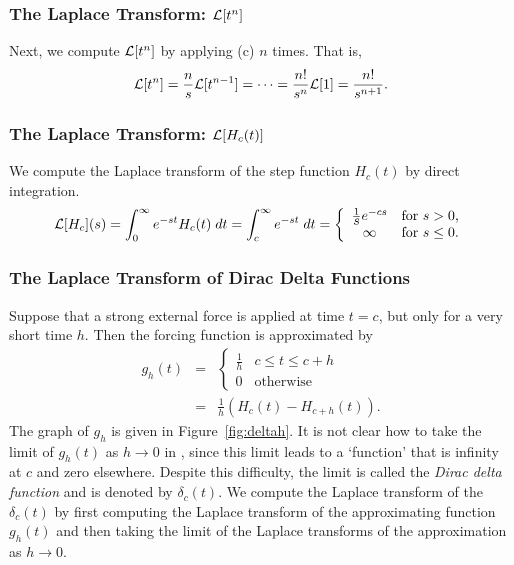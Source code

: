 \documentclass{ximera}
\begin{document}
\subsubsection*{The Laplace Transform: ${\cal L}[t^n]$}

Next, we compute ${\cal L}[t^n]$ by applying (c) $n$ times.
That is, 
\[
{\cal L}[t^n] = \frac{n}{s}{\cal L}[t^{n-1}] = \cdots =
\frac{n!}{s^n}{\cal L}[1] = \frac{n!}{s^{n+1}}.
\]

\subsubsection*{The Laplace Transform: ${\cal L}[H_c(t)]$}

We compute the Laplace transform of the step function $H_c(t)$ by direct 
integration.  
\[
{\cal L}[H_c](s) = \int_0^{\infty} e^{-st}H_c(t)\; dt
= \int_c^{\infty} e^{-st}\; dt
=\left\{ \begin{array}{cl} \frac{1}{\displaystyle s}e^{-cs} & \mbox{for $s>0$,}\\
\infty & \mbox{for $s\le 0$.}\end{array}\right.
\]


\subsubsection*{The Laplace Transform of Dirac Delta Functions}

Suppose that a strong external force is applied at time $t=c$, but only for a 
very short time $h$.  Then the forcing function is approximated by
\begin{equation}  \label{eq:deltah}
\begin{array}{rcl}
g_h(t) & =  & 
\left\{\begin{array}{cc} \frac{1}{h} & c\leq t \leq c+h \\ 
		0 & \mbox{otherwise} \end{array} \right. \\
 & = & \frac{1}{h} \left(H_c(t)-H_{c+h}(t)\right). 
\end{array}
\end{equation}
The graph of $g_h$ is given in Figure~\ref{fig:deltah}.  It is not clear how 
to take the limit of $g_h(t)$ as $h\to 0$ in , since this limit 
leads to a `function' that is infinity at $c$ and zero elsewhere.  Despite 
this difficulty, the limit is called the {\em Dirac delta function}
 and is denoted by $\delta_c(t)$.  We compute the 
Laplace transform of the $\delta_c(t)$ by first computing the Laplace 
transform of the approximating function $g_h(t)$ and then taking the limit of 
the Laplace transforms of the approximation as $h\to 0$.
\end{document}
